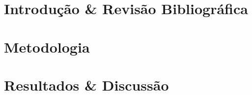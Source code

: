 \documentclass[
	12pt,				%
	openright,			%
	twoside,			%
	a4paper,			%
	chapter=TITLE,		%
	english,			%
	french,				%
	spanish,			%
	brazil				%
	]{abntex2}
\begin{document}
\part{Introdução \& Revisão Bibliográfica}







\part{Metodologia}



\part{Resultados \& Discussão}










\postextual



%
%

\end{document}
